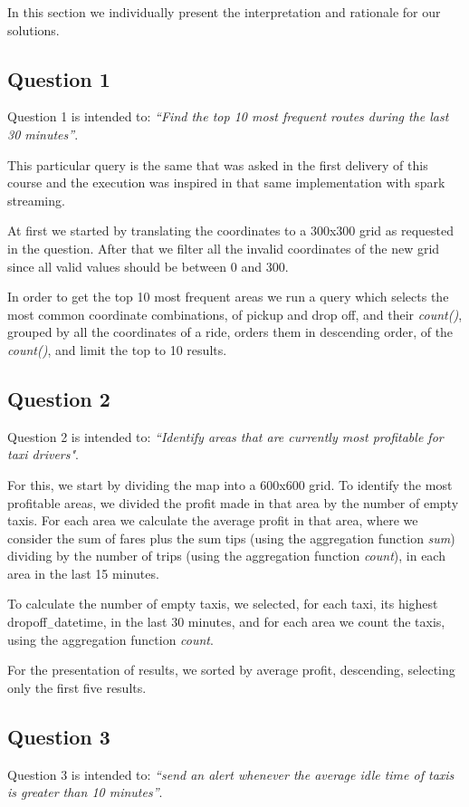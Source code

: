 In this section we individually present the interpretation and rationale for our solutions.

\subsection{Question 1}
Question 1 is intended to: \textit{``Find the top 10 most frequent routes during the last 30 minutes''}.

This particular query is the same that was asked in the first delivery of this course and the execution was inspired in that same implementation with spark streaming.

At first we started by translating the coordinates to a 300x300 grid as requested in the question. After that we filter all the invalid coordinates of the new grid since all valid values should be between 0 and 300.

In order to get the top 10 most frequent areas we run a query which selects the most common coordinate combinations, of pickup and drop off, and their \textit{count()}, grouped by all the coordinates of a ride, orders them in descending order, of the \textit{count()}, and limit the top to 10 results.



\subsection{Question 2}

Question 2 is intended to: \textit{``Identify areas that are currently most profitable for taxi drivers"}.\par
For this, we start by dividing the map into a 600x600 grid. To identify the most profitable areas, we divided the profit made in that area by the number of empty taxis.
For each area we calculate the average profit in that area, where we consider the sum of fares plus the sum tips (using the aggregation function \textit{sum}) dividing by the number of trips (using the aggregation function \textit{count}), in each area in the last 15 minutes.\par
To calculate the number of empty taxis, we selected, for each taxi, its highest dropoff$_-$datetime, in the last 30 minutes, and for each area we count the taxis, using the aggregation function \textit{count}.\par
For the presentation of results, we sorted by average profit, descending, selecting only the first five results. 

\subsection{Question 3}
Question 3 is intended to: \textit{``send an alert whenever the average idle time of taxis is greater than 10 minutes''}.

